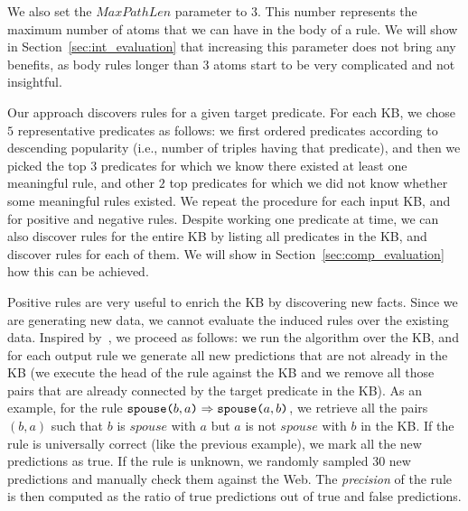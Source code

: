 We also set the $MaxPathLen$ parameter to $3$. This number represents the maximum number of atoms that we can have in the body of a rule. We will show in Section~\ref{sec:int_evaluation} that increasing this parameter does not bring any benefits, as body rules longer than $3$ atoms start to be very complicated and not insightful.

Our approach discovers rules for a given target predicate. For each KB, we chose $5$ representative predicates as follows: we first ordered predicates according to descending popularity (i.e., number of triples having that predicate), and then we picked the top $3$ predicates for which we know there existed at least one meaningful rule, and other $2$ top predicates for which we did not know whether some meaningful rules existed. We repeat the procedure for each input KB, and for positive and negative rules. Despite working one predicate at time, we can also discover rules for the entire KB by listing all predicates in the KB, and discover rules for each of them. We will show in Section~\ref{sec:comp_evaluation} how this can be achieved.

Positive rules are very useful to enrich the KB by discovering new facts. Since we are generating new data, we cannot evaluate the induced rules over the existing data. Inspired by~\cite{galarraga2015fast}, we proceed as follows: we run the algorithm over the KB, and for each output rule we generate all new predictions that are not already in the KB (we execute the head of the rule against the KB and we remove all those pairs that are already connected by the target predicate in the KB). As an example, for the rule $\texttt{spouse(}b,a\texttt{)} \Rightarrow \texttt{spouse(}a,b\texttt{)}$, we retrieve all the pairs $(b,a)$ such that $b$ is $spouse$ with $a$ but $a$ is not $spouse$ with $b$ in the KB. If the rule is universally correct (like the previous example), we mark all the new predictions as true. If the rule is unknown, we randomly sampled 30 new predictions and manually check them against the Web. The \emph{precision} of the rule is then computed as the ratio of true predictions out of true and false predictions.


